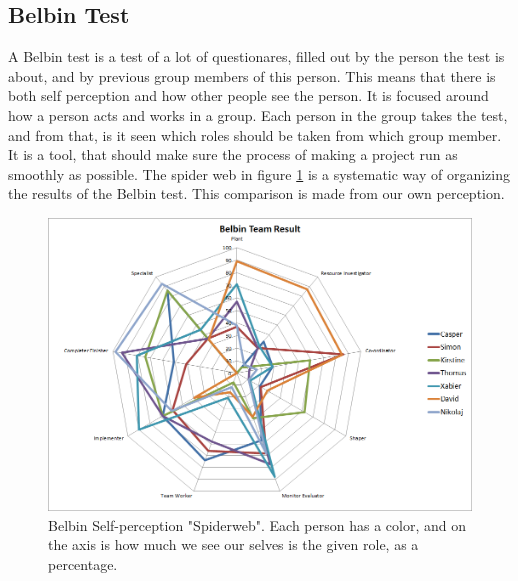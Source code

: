 \subsection{Belbin Test}
A Belbin test is a test of a lot of questionares, filled out by the person the test is about, and by previous group members of this person. This means that there is both self perception and how other people see the person. It is focused around how a person acts and works in a group. Each person in the group takes the test, and from that, is it seen which roles should be taken from which group member. It is a tool, that should make sure the process of making a project run as smoothly as possible. 
The spider web in figure \ref{belbinspider} is a systematic way of organizing the results of the Belbin test.
This comparison is made from our own perception.

\begin{figure} [h!]
\includegraphics[width=\textwidth]{./graphics/Belbin_spiderweb}
\caption[Belbin Self-perception "Spiderweb".]{Belbin Self-perception "Spiderweb". Each person has a color, and on the axis is how much we see our selves is the given role, as a percentage.}
\label{belbinspider}
\end{figure}

